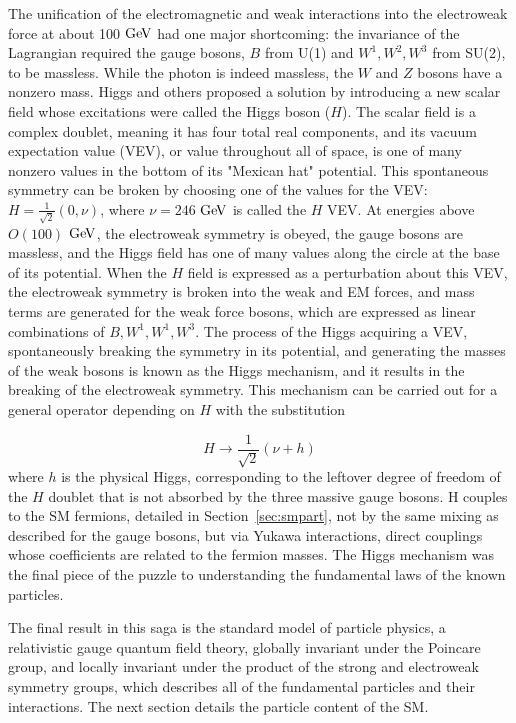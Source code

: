 \indent The unification of the electromagnetic and weak interactions into the electroweak force at about 100 $\mathrm{Ge\kern -0.1em V}$ had one major shortcoming: the invariance of the Lagrangian required the gauge bosons, $B$ from U(1) and $W^1, W^2, W^3$ from SU(2), to be massless. While the photon is indeed massless, the $W$ and $Z$ bosons have a nonzero mass. Higgs and others \cite{PhysRevLett.13.321, Higgs:1964ia, PhysRevLett.13.508, PhysRevLett.13.585, PhysRev.145.1156, Kibble:1967sv} proposed a solution by introducing a new scalar field whose excitations were called the Higgs boson ($H$). The scalar field is a complex doublet, meaning it has four total real components, and its vacuum expectation value (VEV), or value throughout all of space, is one of many nonzero values in the bottom of its "Mexican hat" potential. This spontaneous symmetry can be broken by choosing one of the values for the VEV: $H = \frac{1}{\sqrt{2}} (0, \nu)$, where $\nu=246$ $\mathrm{Ge\kern -0.1em V}$ is called the $H$ VEV. At energies above $O(100)$ $\mathrm{Ge\kern -0.1em V}$, the electroweak symmetry is obeyed, the gauge bosons are massless, and the Higgs field has one of many values along the circle at the base of its potential. When the $H$ field is expressed as a perturbation about this VEV, the electroweak symmetry is broken into the weak and EM forces, and mass terms are generated for the weak force bosons, which are expressed as linear combinations of $B, W^1, W^1, W^3$. The process of the Higgs acquiring a VEV, spontaneously breaking the symmetry in its potential, and generating the masses of the weak bosons is known as the Higgs mechanism, and it results in the breaking of the electroweak symmetry. This mechanism can be carried out for a general operator depending on $H$ with the substitution

\begin{equation}
H \rightarrow \frac{1}{\sqrt{2}} (\nu + h)
\end{equation}
where $h$ is the physical Higgs, corresponding to the leftover degree of freedom of the $H$ doublet that is not absorbed by the three massive gauge bosons. H couples to the SM fermions, detailed in Section~\ref{sec:smpart}, not by the same mixing as described for the gauge bosons, but via Yukawa interactions, direct couplings whose coefficients are related to the fermion masses. The Higgs mechanism was the final piece of the puzzle to understanding the fundamental laws of the known particles.
 
\indent The final result in this saga is the standard model of particle physics, a relativistic gauge quantum field theory, globally invariant under the Poincare group, and locally invariant under the product of the strong and electroweak symmetry groups, which describes all of the fundamental particles and their interactions. The next section details the particle content of the SM.

